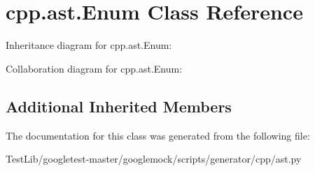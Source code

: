\hypertarget{classcpp_1_1ast_1_1Enum}{}\section{cpp.\+ast.\+Enum Class Reference}
\label{classcpp_1_1ast_1_1Enum}


Inheritance diagram for cpp.\+ast.\+Enum\+:


Collaboration diagram for cpp.\+ast.\+Enum\+:
\subsection*{Additional Inherited Members}


The documentation for this class was generated from the following file\+:\begin{DoxyCompactItemize}
\item 
Test\+Lib/googletest-\/master/googlemock/scripts/generator/cpp/ast.\+py\end{DoxyCompactItemize}
